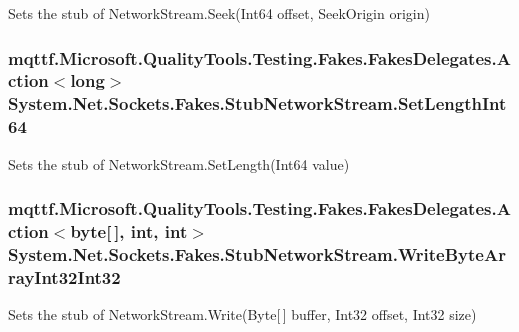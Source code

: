 Sets the stub of Network\-Stream.\-Seek(\-Int64 offset, Seek\-Origin origin)

\hypertarget{class_system_1_1_net_1_1_sockets_1_1_fakes_1_1_stub_network_stream_aefd653f11370ff514e56c7f62d69d464}{
\subsubsection[{Set\-Length\-Int64}]{\setlength{\rightskip}{0pt plus 5cm}mqttf.\-Microsoft.\-Quality\-Tools.\-Testing.\-Fakes.\-Fakes\-Delegates.\-Action$<$long$>$ System.\-Net.\-Sockets.\-Fakes.\-Stub\-Network\-Stream.\-Set\-Length\-Int64}}\label{class_system_1_1_net_1_1_sockets_1_1_fakes_1_1_stub_network_stream_aefd653f11370ff514e56c7f62d69d464}


Sets the stub of Network\-Stream.\-Set\-Length(\-Int64 value)

\hypertarget{class_system_1_1_net_1_1_sockets_1_1_fakes_1_1_stub_network_stream_a1ad27ca1c420858a388d21fbdc87240b}{
\subsubsection[{Write\-Byte\-Array\-Int32\-Int32}]{\setlength{\rightskip}{0pt plus 5cm}mqttf.\-Microsoft.\-Quality\-Tools.\-Testing.\-Fakes.\-Fakes\-Delegates.\-Action$<$byte\mbox{[}$\,$\mbox{]}, int, int$>$ System.\-Net.\-Sockets.\-Fakes.\-Stub\-Network\-Stream.\-Write\-Byte\-Array\-Int32\-Int32}}\label{class_system_1_1_net_1_1_sockets_1_1_fakes_1_1_stub_network_stream_a1ad27ca1c420858a388d21fbdc87240b}


Sets the stub of Network\-Stream.\-Write(\-Byte\mbox{[}$\,$\mbox{]} buffer, Int32 offset, Int32 size)

